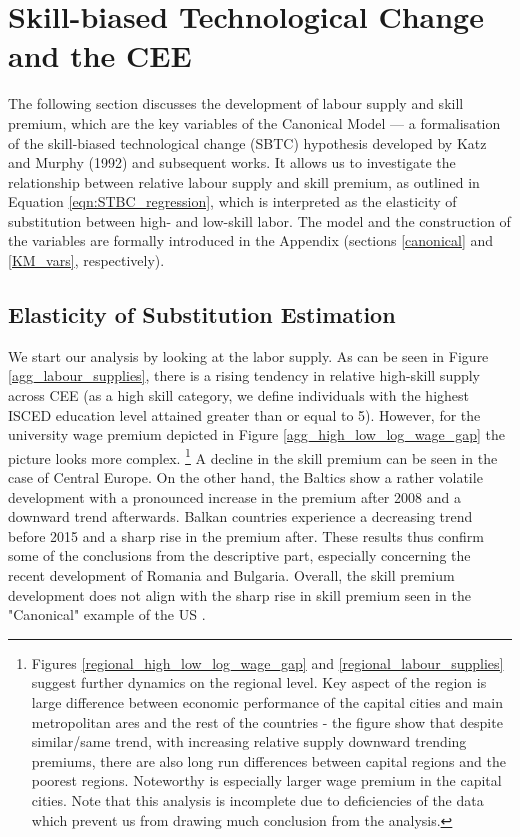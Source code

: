 \documentclass[11pt]{article}
\begin{document}
\section{Skill-biased Technological Change and the CEE}\label{skill_bias_cee}

The following section discusses the development of labour supply and skill premium, which are the key variables of the Canonical Model — a formalisation of the skill-biased technological change (SBTC) hypothesis developed by Katz and Murphy (1992) and subsequent works. It allows us to investigate the relationship between relative labour supply and skill premium, as outlined in Equation \ref{eqn:STBC_regression}, which is interpreted as the elasticity of substitution between high- and low-skill labor. The model and the construction of the variables are formally introduced in the Appendix (sections \ref{canonical} and \ref{KM_vars}, respectively). 

\subsection{Elasticity of Substitution Estimation}


We start our analysis by looking at the labor supply. As can be seen in Figure \ref{agg_labour_supplies}, there is a rising tendency in relative high-skill supply across CEE (as a high skill category, we define individuals with the highest ISCED education level attained greater than or equal to 5). However, for the university wage premium depicted in Figure \ref{agg_high_low_log_wage_gap} the picture looks more complex.%
\footnote{Figures \ref{regional_high_low_log_wage_gap} and  \ref{regional_labour_supplies} suggest further dynamics on the regional level. Key aspect of the region is large difference between economic performance of the capital cities and main metropolitan ares and the rest of the countries - the figure show that despite similar/same trend, with increasing relative supply downward trending premiums, there are also long run differences between capital regions and the poorest regions. Noteworthy is especially larger wage premium in the capital cities. Note that this analysis is incomplete due to deficiencies of the data which prevent us from drawing much conclusion from the analysis.} 
A decline in the skill premium can be seen in the case of Central Europe. On the other hand, the Baltics show a rather volatile development with a pronounced increase in the premium after 2008 and a downward trend afterwards. Balkan countries experience a decreasing trend before 2015 and a sharp rise in the premium after. These results thus confirm some of the conclusions from the descriptive part, especially concerning the recent development of Romania and Bulgaria.
Overall, the skill premium development does not align with the sharp rise in skill premium seen in the "Canonical" example of the US \citep{acemoglu2002directed}. 
\end{document}
